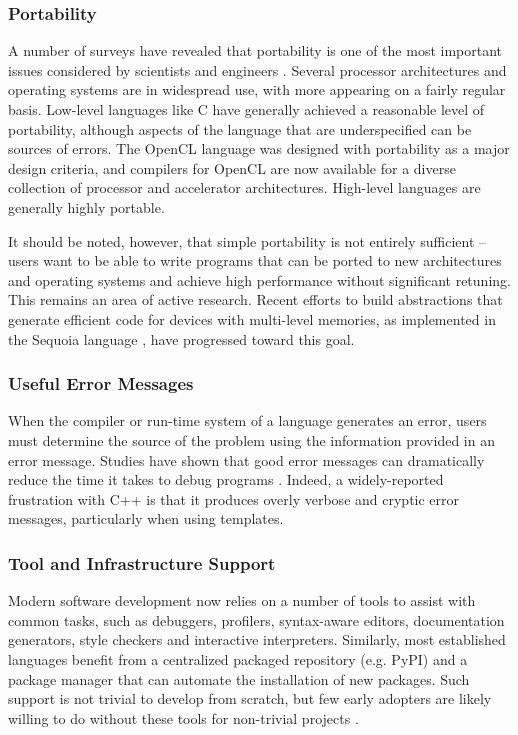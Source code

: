\subsubsection{Portability}\label{portability}
A number of surveys have revealed that portability is one of the most important issues considered by scientists and engineers \cite{hannay2009scientists}\cite{basili2008understanding}. Several processor architectures and operating systems are in widespread use, with more appearing on a fairly regular basis. Low-level languages like C have generally achieved a reasonable level of portability, although aspects of the language that are underspecified can be sources of errors. The OpenCL language was designed with portability as a major design criteria, and compilers for OpenCL are now available for a diverse collection of processor and accelerator architectures. High-level languages are generally highly portable. 

It should be noted, however, that simple portability is not entirely sufficient -- users want to be able to write programs that can be ported to new architectures and operating systems and achieve high performance without significant retuning. This remains an area of active research. Recent efforts to build abstractions that generate efficient code for devices with multi-level memories, as implemented in the Sequoia language \cite{fatahalian2006sequoia}, have  progressed toward this goal.

\subsubsection{Useful Error Messages}\label{errors}
When the compiler or run-time system of a language generates an error, users must determine the source of the problem using the information provided in an error message. Studies have shown that good error messages can dramatically reduce the time it takes to debug programs \cite{marceau2011measuring}. Indeed, a widely-reported frustration with C++ is that it produces overly verbose and cryptic error messages, particularly when using templates.

\subsubsection{Tool and Infrastructure Support}\label{tools}
Modern software development now relies on a number of tools to assist with common tasks, such as debuggers,  profilers, syntax-aware editors, documentation generators, style checkers and interactive interpreters. Similarly, most established languages benefit from a centralized packaged repository (e.g. PyPI) and a package manager that can automate the installation of new packages. Such support is not trivial to develop from scratch, but few early adopters are likely willing to do without these tools for non-trivial projects \cite{squires2005programmers}.

